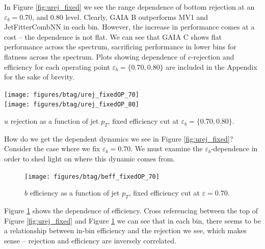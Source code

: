 In Figure \ref{fig:urej_fixed} we see the \pt range dependence of bottom rejection at an $\varepsilon_b =  0.70$, and 0.80 level. Clearly, GAIA B outperforms MV1 and JetFitterCombNN in each \pt bin. However, the increase in performance comes at a cost -- the \pt dependence is not flat. We can see that GAIA C shows flat performance across the \pt spectrum, sacrificing performance in lower \pt bins for flatness across the spectrum. Plots showing \pt dependence of $c$-rejection and efficiency for each operating point $\varepsilon_b = \{0.70, 0.80\}$ are included in the Appendix for the sake of brevity. 


\begin{FPfigure}
\texttt{[image: figures/btag/urej\_fixedOP\_70]}\\
\texttt{[image: figures/btag/urej\_fixedOP\_80]}
\caption[perf_plot]{$u$ rejection as a function of jet $p_T$, fixed efficiency cut at $\varepsilon_b = \{0.70, 0.80\}$.
\label{fig:urej_fixed}}
\end{FPfigure}

How do we get the \pt dependent dynamics we see in Figure \ref{fig:urej_fixed}? Consider the case where we fix $\varepsilon_b = 0.70$. We must examine the $\varepsilon_b$-\pt dependence in order to shed light on where this dynamic comes from.

\begin{figure}
\texttt{[image: figures/btag/beff\_fixedOP\_70]}
\caption[perf_plot]{$b$ efficiency as a function of jet $p_T$, fixed efficiency cut at $\varepsilon = 0.70$.
\label{fig:beff_fixedOP_70}}
\end{figure}

Figure \ref{fig:beff_fixedOP_70} shows the \pt dependence of efficiency. Cross referencing between the top of Figure \ref{fig:urej_fixed} and Figure \ref{fig:beff_fixedOP_70} we can see that in each \pt bin, there seems to be a relationship between in-bin efficiency and the rejection we see, which makes sense -- rejection and efficiency are inversely correlated. 

